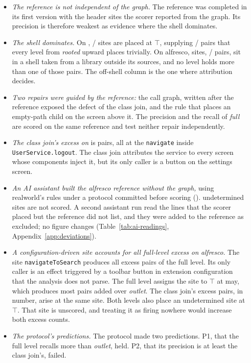 \begin{itemize}
\item \emph{The reference is not independent of the graph.} The \GTApp{} reference was completed in its
  first version with the header sites the scorer reported from the graph. Its precision is therefore
  weakest as evidence where the shell dominates.
\item \emph{The shell dominates.} On \GTApp{}, \GTShellSites{}/\GTSites{} sites are placed at
  $\top$, supplying \GTShellPairs{}/\GTPairs{} pairs that every level from \emph{rooted} upward places
  trivially. On alfresco, \GTAlfShellSites{} sites, \GTAlfShellPairs{}/\GTAlfPairs{}
  pairs, sit in a shell taken from a library outside its sources, and no level holds more than one of those pairs. The off-shell column is the one where
  attribution decides.
\item \emph{Two repairs were guided by the reference:} the call graph, written after the \GTApp{}
  reference exposed the defect of the class join, and the rule that places an empty-path child on the
  screen above it. The \GTFullPrecision{} precision and the recall of
  \emph{full} are scored on the same reference and test neither repair independently.
\item \emph{The class join's excess on \GTApp{}} is \GTClassExcess{} pairs, all at the
  \texttt{navigate} inside \texttt{UserService.logout}. The class join attributes the service to
  every screen whose components inject it, but its only caller is a button on the settings screen.
\item \emph{An AI assistant built the alfresco reference without the graph,} using realworld's rules
  under a protocol committed before scoring ().
  \GTAlfUndetermined{} undetermined sites are not scored. A second assistant run read the lines
  that the scorer placed but the reference did not list, and they were added to the reference as
  excluded; no figure changes (Table~\ref{tab:ai-readings}, Appendix~\ref{app:deviations}).
\item \emph{A configuration-driven site accounts for all full-level excess on alfresco.}
  The site \texttt{navigateToSearch} produces all \GTAlfFullExcess{} excess pairs of the full level. Its only caller is an
  effect triggered by a toolbar button in extension configuration that the analysis does not parse.
  The full level assigns the site to $\top$ at may, which produces most pairs added over
  \emph{outlet}. The class join's excess pairs, \GTAlfClassExcess{} in number, arise at the same
  site. Both levels also place an undetermined site at $\top$. That site is unscored, and treating
  it as firing nowhere would increase both excess counts.
\item \emph{The protocol's predictions.} The protocol made two predictions. P1, that the full level recalls
  more than \emph{outlet}, held. P2, that its precision is at least the class join's, failed.
\end{itemize}

